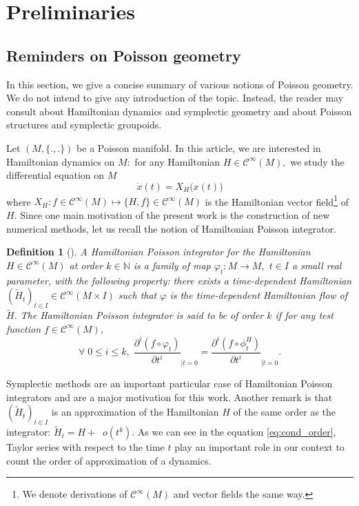 \documentclass[a4paper,11pt]{article}
\newcommand{\smallO}[1]{\ensuremath{\mathop{}\mathopen{}o\mathopen{}\left(#1\right)}}
\newcommand{\func}[1]{\mathcal{C}^{\infty}(#1)}
\newtheorem{definition}[theorem]{Definition}
\begin{document}
\section{Preliminaries}\label{sec:preli_mais_pas_pre_lie}

\subsection{Reminders on Poisson geometry}

In this section, we give a concise summary of various notions of Poisson geometry. We do not intend to give any introduction of the topic. Instead, the reader may consult   \cite{Marle1987} about Hamiltonian dynamics and symplectic geometry and \cite{Crainic2021, Zung2005} about Poisson structures and symplectic groupoids.

Let $(M, \{.,.\})$ be a Poisson manifold. In this article, we are interested in Hamiltonian dynamics on $M:$ for any Hamiltonian $H \in \func{M},$ we study the differential equation on $M$
\begin{equation}\label{eq:Ham_eq}
\dot{x}(t) = X_H \bigl(x(t)\bigr)
\end{equation}
where $X_H \colon f \in \func{M} \mapsto \{H,f\} \in \func{M}$ is the Hamiltonian vector field\footnote{We denote derivations of $\func{M}$ and vector fields the same way.} of $H.$ Since one main motivation of the present work is the construction of new numerical methods, let us recall the notion of Hamiltonian Poisson integrator.

\begin{definition}[\cite{Oscar2022}]
A Hamiltonian Poisson integrator for the Hamiltonian $H \in \func{M}$ at order $k \in \mathbb{N}$ is a family of map $\varphi_{t} \colon M \to M,$ $t \in I$ a small real parameter, with the following property: there exists a time-dependent Hamiltonian $(\tilde{H}_t)_{t \in I} \in \func{M \times I}$ such that $\varphi$ is the time-dependent Hamiltonian flow of $\tilde{H}.$ The Hamiltonian Poisson integrator is said to be of order $k$ if for any test function $f \in \func{M},$
\begin{equation}\label{eq:cond_order}
\forall \; 0 \leq i \leq k, \; \frac{\partial^i (f \circ \varphi_t)}{\partial t^i}_{|t=0}  = \frac{\partial^i (f \circ \phi_t^H)}{\partial t^i}_{|t=0}.
\end{equation}
\end{definition}
Symplectic methods are an important particular case of Hamiltonian Poisson integrators and are a major motivation for this work. Another remark is that $(\tilde{H}_t)_{t \in I}$ is an approximation of the Hamiltonian $H$ of the same order as the integrator: $\tilde{H}_t = H + \smallO{t^k}.$ As we can see in the equation \eqref{eq:cond_order}, Taylor series with respect to the time $t$ play an important role in our context to count the order of approximation of a dynamics.
\end{document}
